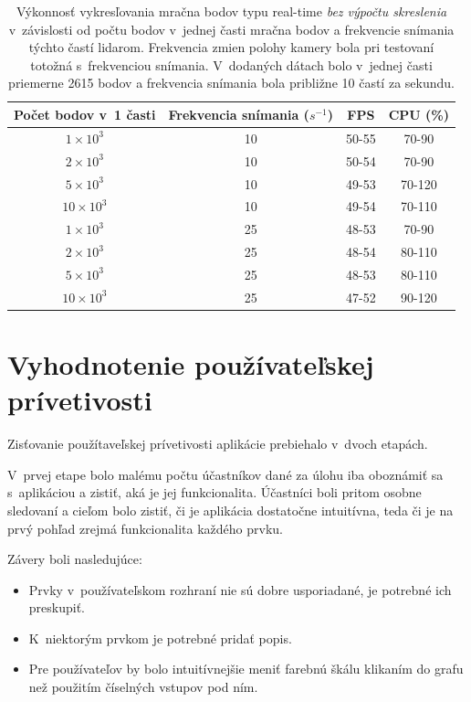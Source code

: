 \begin{table}[t]
    \centering
    \begin{tabular}{c|c||c|c}
        Počet bodov v~1 časti & Frekvencia snímania ($s^{-1}$) & FPS & CPU (\%) \\ \hline
        { }$1\times10^3$ & 10 & 50-55 & 70-90 \\
        { }$2\times10^3$ & 10 & 50-54 & 70-90 \\
        { }$5\times10^3$ & 10 & 49-53 & 70-120 \\
        $10\times10^3$ & 10 & 49-54 & 70-110 \\ \hline
        { }$1\times10^3$ & 25 & 48-53 & 70-90 \\
        { }$2\times10^3$ & 25 & 48-54 & 80-110 \\
        { }$5\times10^3$ & 25 & 48-53 & 80-110 \\
        $10\times10^3$ & 25 & 47-52 & 90-120 \\
    \end{tabular}
    \caption{Výkonnosť vykresľovania mračna bodov typu real-time \emph{bez výpočtu skreslenia} v~závislosti od počtu bodov v~jednej časti mračna bodov a frekvencie snímania týchto častí lidarom. Frekvencia zmien polohy kamery bola pri testovaní totožná s~frekvenciou snímania. V~dodaných dátach bolo v~jednej časti priemerne 2615 bodov a frekvencia snímania bola približne 10 častí za sekundu.}
    \label{tab:vykonnost_realtime}
\end{table}

\section{Vyhodnotenie používateľskej prívetivosti}

Zisťovanie použítaveľskej prívetivosti aplikácie prebiehalo v~dvoch etapách.

V~prvej etape bolo malému počtu účastníkov dané za úlohu iba oboznámiť sa s~aplikáciou a zistiť, aká je jej funkcionalita. Účastníci boli pritom osobne sledovaní a cieľom bolo zistiť, či je aplikácia dostatočne intuitívna, teda či je na prvý pohľad zrejmá funkcionalita každého prvku.

\pagebreak

Závery boli nasledujúce:
\begin{itemize}
    \item Prvky v~používateľskom rozhraní nie sú dobre usporiadané, je potrebné ich preskupiť.
    \item K~niektorým prvkom je potrebné pridať popis.
    \item Pre používateľov by bolo intuitívnejšie meniť farebnú škálu klikaním do grafu než použitím číselných vstupov pod ním.
\end{itemize}

